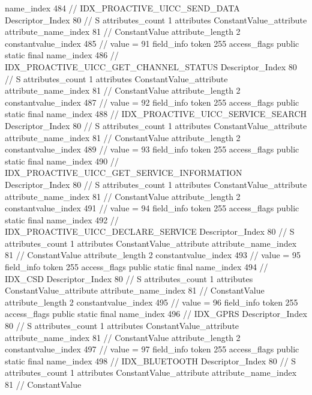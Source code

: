 {{{{{				name_index	484		// IDX_PROACTIVE_UICC_SEND_DATA
				Descriptor_Index	80		// S
				attributes_count	1
				attributes {
				ConstantValue_attribute {
					attribute_name_index	81		// ConstantValue
					attribute_length	2
					constantvalue_index	485		// value = 91
				}
				}
			}
			field_info {
				token	255
				access_flags	public static final
				name_index	486		// IDX_PROACTIVE_UICC_GET_CHANNEL_STATUS
				Descriptor_Index	80		// S
				attributes_count	1
				attributes {
				ConstantValue_attribute {
					attribute_name_index	81		// ConstantValue
					attribute_length	2
					constantvalue_index	487		// value = 92
				}
				}
			}
			field_info {
				token	255
				access_flags	public static final
				name_index	488		// IDX_PROACTIVE_UICC_SERVICE_SEARCH
				Descriptor_Index	80		// S
				attributes_count	1
				attributes {
				ConstantValue_attribute {
					attribute_name_index	81		// ConstantValue
					attribute_length	2
					constantvalue_index	489		// value = 93
				}
				}
			}
			field_info {
				token	255
				access_flags	public static final
				name_index	490		// IDX_PROACTIVE_UICC_GET_SERVICE_INFORMATION
				Descriptor_Index	80		// S
				attributes_count	1
				attributes {
				ConstantValue_attribute {
					attribute_name_index	81		// ConstantValue
					attribute_length	2
					constantvalue_index	491		// value = 94
				}
				}
			}
			field_info {
				token	255
				access_flags	public static final
				name_index	492		// IDX_PROACTIVE_UICC_DECLARE_SERVICE
				Descriptor_Index	80		// S
				attributes_count	1
				attributes {
				ConstantValue_attribute {
					attribute_name_index	81		// ConstantValue
					attribute_length	2
					constantvalue_index	493		// value = 95
				}
				}
			}
			field_info {
				token	255
				access_flags	public static final
				name_index	494		// IDX_CSD
				Descriptor_Index	80		// S
				attributes_count	1
				attributes {
				ConstantValue_attribute {
					attribute_name_index	81		// ConstantValue
					attribute_length	2
					constantvalue_index	495		// value = 96
				}
				}
			}
			field_info {
				token	255
				access_flags	public static final
				name_index	496		// IDX_GPRS
				Descriptor_Index	80		// S
				attributes_count	1
				attributes {
				ConstantValue_attribute {
					attribute_name_index	81		// ConstantValue
					attribute_length	2
					constantvalue_index	497		// value = 97
				}
				}
			}
			field_info {
				token	255
				access_flags	public static final
				name_index	498		// IDX_BLUETOOTH
				Descriptor_Index	80		// S
				attributes_count	1
				attributes {
				ConstantValue_attribute {
					attribute_name_index	81		// ConstantValue
}}}}}}}
